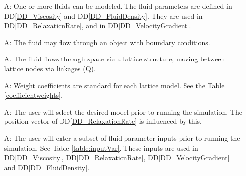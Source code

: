 \documentclass[12pt]{article}
\newcounter{assumpnum} %
\begin{document}
\begin{itemize}

\item[A\refstepcounter{assumpnum}\theassumpnum \label{A_fluids}:]
  One or more fluids can be modeled. The fluid parameters are defined in
  DD\ref{DD_Viscosity} and DD\ref{DD_FluidDensity}. They are used in
  DD\ref{DD_RelaxationRate}, and in DD\ref{DD_VelocityGradient}. 
  
\item[A\refstepcounter{assumpnum}\theassumpnum \label{A_flowObject}:]
  The fluid may flow through an object with boundary conditions. 
  
\item[A\refstepcounter{assumpnum}\theassumpnum \label{A_lattice}:]
  The fluid flows through space via a lattice structure, moving between lattice
  nodes via linkages ($\mathrm{Q}$). 

  
\item[A\refstepcounter{assumpnum}\theassumpnum \label{A_weightCoefficients}:]
  Weight coefficients are standard for each lattice model. See the Table
  \ref{coefficientweights}.  

\item[A\refstepcounter{assumpnum}\theassumpnum \label{A_selectModel}:] The user
  will select the desired model prior to running the simulation. The position
  vector of DD\ref{DD_RelaxationRate} is influenced by this. 

\item[A\refstepcounter{assumpnum}\theassumpnum \label{A_userInputs}:] The user
  will enter a subset of fluid parameter inputs prior to running the
  simulation. See Table \ref{table:inputVar}. These inputs are used in
  DD\ref{DD_Viscosity}, DD\ref{DD_RelaxationRate}, DD\ref{DD_VelocityGradient}
  and DD\ref{DD_FluidDensity}. 
  

\end{itemize}
\end{document}
